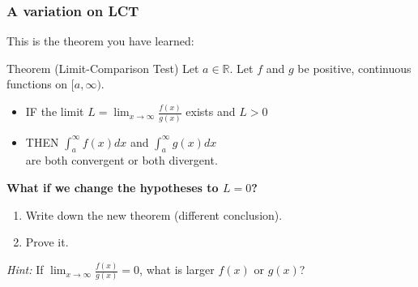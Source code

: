 \documentclass[14pt]{beamer}
\begin{document}
\begin{frame}[t]
	\fontsize{12}{12}\selectfont
	\frametitle{A variation on LCT}

	This is the theorem you have learned:
	\begin{block}{\fontsize{13}{13}\selectfont Theorem (Limit-Comparison Test)}
		Let $\displaystyle a \in \mathbb{R}$. Let $f$ and $g$ be positive, continuous
		functions on $\displaystyle [a, \infty)$.
		\begin{itemize}
			\item IF the limit \; $\displaystyle L = \lim_{x \to \infty}\frac{f(x)}{g(x)}$
				\; exists and \; $\displaystyle L>0$

			\item THEN $\displaystyle \int_{a}^{\infty}\! \! f(x) dx$ \; and \; $\displaystyle
				\int_{a}^{\infty}\! \! g(x) dx$ \\ are both convergent or both divergent.
		\end{itemize}
	\end{block}

	\vspace{.2cm}
	{\bfseries What if we change the hypotheses to $L=0$?}
	\begin{enumerate}
		\item Write down the new theorem (different conclusion).

		\item Prove it.
	\end{enumerate}

	\vspace{.2cm}
	\emph{Hint:} If $\displaystyle \lim_{x \to \infty}\frac{f(x)}{g(x)}=0$, what
	is larger $f(x)$ or $g(x)$?
\end{frame}
\end{document}
